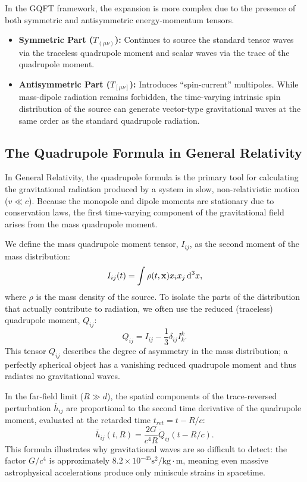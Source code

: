 In the GQFT framework, the expansion is more complex due to the presence of both symmetric and antisymmetric energy-momentum tensors.
\begin{itemize}
  \item \textbf{Symmetric Part ($T_{(\mu\nu)}$):} Continues to source the standard tensor waves via the traceless quadrupole moment and scalar waves via the trace of the quadrupole moment.
  \item \textbf{Antisymmetric Part ($T_{[\mu\nu]}$):} Introduces ``spin-current'' multipoles. While mass-dipole radiation remains forbidden, the time-varying intrinsic spin distribution of the source can generate vector-type gravitational waves at the same order as the standard quadrupole radiation.
\end{itemize}

\subsection{The Quadrupole Formula in General Relativity} In General Relativity, the quadrupole formula is the primary tool for calculating the gravitational radiation produced by a system in slow, non-relativistic motion ($v \ll c$). Because the monopole and dipole moments are stationary due to conservation laws, the first time-varying component of the gravitational field arises from the mass quadrupole moment.

We define the mass quadrupole moment tensor, $I_{ij}$, as the second moment of the mass distribution:
\[%
  I_{ij}(t) = \int \rho(t, \x) x_i x_j \dd[3]{x}
,\]%
where $\rho$ is the mass density of the source. To isolate the parts of the distribution that actually contribute to radiation, we often use the reduced (traceless) quadrupole moment, $Q_{ij}$:
\[%
  Q_{ij} = I_{ij} - \frac{1}{3}\delta_{ij}I^k_{k}
.\]%
This tensor $Q_{ij}$ describes the degree of asymmetry in the mass distribution; a perfectly spherical object has a vanishing reduced quadrupole moment and thus radiates no gravitational waves.

In the far-field limit ($R \gg d$), the spatial components of the trace-reversed perturbation $\bar{h}_{ij}$ are proportional to the second time derivative of the quadrupole moment, evaluated at the retarded time $t_{ret} = t - R/c$:
\[%
  \bar{h}_{ij}(t, R) = \frac{2G}{c^4 R} \ddot{Q}_{ij}(t - R/c)
.\]%
This formula illustrates why gravitational waves are so difficult to detect: the factor $G/c^4$ is approximately $8.2 \times 10^{-45} \text{s}^2/\text{kg}\cdot\text{m}$, meaning even massive astrophysical accelerations produce only miniscule strains in spacetime.

